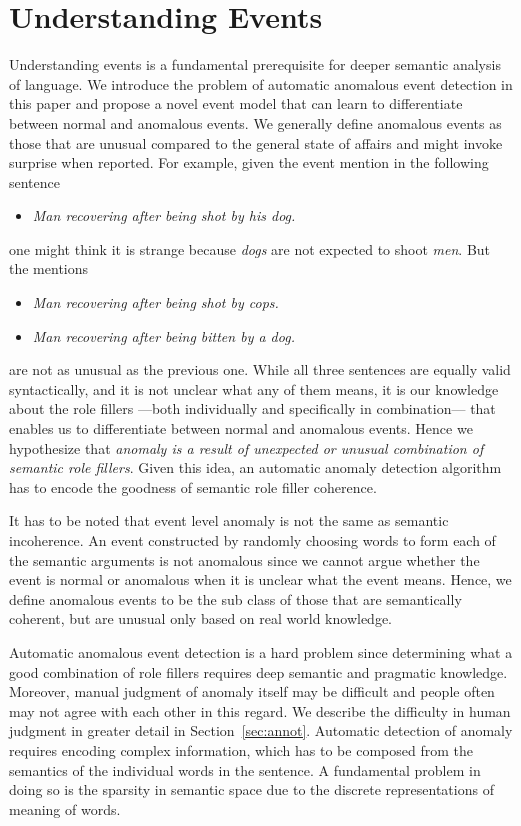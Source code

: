 \section{Understanding Events}
Understanding events is a fundamental prerequisite for deeper semantic 
analysis of language.  We introduce the problem of automatic anomalous event
detection
in this paper and propose a novel event model that can learn to differentiate
between normal
and anomalous events.  We generally define anomalous events as those that are
unusual compared
to the general state of affairs and might invoke surprise when reported.  For
example, given the event mention in the 
following sentence 
\begin{itemize}
 \item[] \textit{Man recovering after being shot by his dog.}
\end{itemize}
one might think it is strange because \textit{dogs} are not expected
to shoot \textit{men}.  But the mentions
\begin{itemize}
 \item[] \textit{Man recovering after being shot by cops.}
 \item[] \textit{Man recovering after being bitten by a dog.}
\end{itemize}
are not as unusual as the previous one.  While all three sentences are equally
valid syntactically, and it is not unclear what any of them means, it 
is our knowledge about the role fillers 
---both individually and specifically in combination---  
that enables us to 
differentiate between normal and anomalous events.  Hence we hypothesize that
\emph{anomaly is a result of unexpected or 
unusual combination of semantic role fillers}.  Given this idea, an automatic
anomaly detection algorithm has to encode
the goodness of semantic role filler coherence.  


It has to be noted that event level anomaly is not the same as semantic incoherence.
An event constructed by randomly choosing words to form each of the semantic arguments
is not anomalous since we cannot argue whether the event is normal or anomalous when
it is unclear what the event means.  Hence, we define anomalous events to be the 
sub class of those that are semantically coherent, but are unusual only based on 
real world knowledge.

Automatic anomalous event detection is a hard problem since
determining what a good combination of role fillers
requires deep semantic and pragmatic knowledge.  
Moreover, manual judgment of anomaly itself may be difficult and people often
may not agree with each other in this
regard.  We describe the difficulty in human judgment in greater detail in
Section~\ref{sec:annot}.  
Automatic detection of anomaly requires encoding complex information, which has 
to be composed from the semantics of the individual words in the sentence.  A 
fundamental problem in doing so is the sparsity in semantic space due to 
the discrete representations of meaning of words. 

